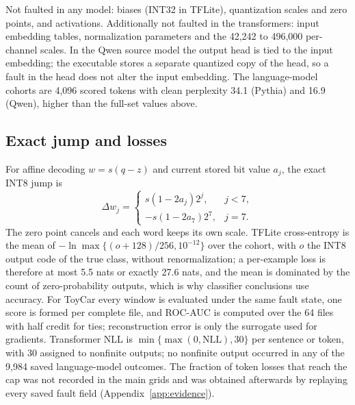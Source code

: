Not faulted in any model: biases (INT32 in TFLite), quantization scales and zero points, and activations. Additionally not faulted in the transformers: input embedding tables, normalization parameters and the 42,242 to 496,000 per-channel scales. In the Qwen source model the output head is tied to the input embedding; the executable stores a separate quantized copy of the head, so a fault in the head does not alter the input embedding. The language-model cohorts are 4,096 scored tokens with clean perplexity 34.1 (Pythia) and 16.9 (Qwen), higher than the full-set values above.

\subsection{Exact jump and losses}
For affine decoding $w=s(q-z)$ and current stored bit value $a_j$, the exact INT8 jump is
\begin{equation}\label{eq:xor-delta}
\Delta w_j=\begin{cases}s(1-2a_j)2^j,&j<7,\\-s(1-2a_7)2^7,&j=7.\end{cases}
\end{equation}
The zero point cancels and each word keeps its own scale. TFLite cross-entropy is the mean of $-\ln\max\{(o+128)/256,10^{-12}\}$ over the cohort, with $o$ the INT8 output code of the true class, without renormalization; a per-example loss is therefore at most 5.5 nats or exactly 27.6 nats, and the mean is dominated by the count of zero-probability outputs, which is why classifier conclusions use accuracy. For ToyCar every window is evaluated under the same fault state, one score is formed per complete file, and ROC-AUC is computed over the 64 files with half credit for ties; reconstruction error is only the surrogate used for gradients. Transformer NLL is $\min\{\max(0,\mathrm{NLL}),30\}$ per sentence or token, with 30 assigned to nonfinite outputs; no nonfinite output occurred in any of the 9,984 saved language-model outcomes. The fraction of token losses that reach the cap was not recorded in the main grids and was obtained afterwards by replaying every saved fault field (Appendix~\ref{app:evidence}).

